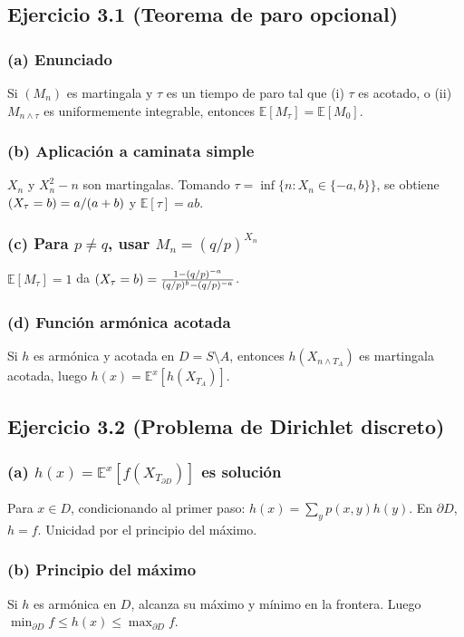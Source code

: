 \documentclass[12pt]{article}
\let\P\relax
\newcommand{\P}{\mathbb{P}}
\newcommand{\E}{\mathbb{E}}
\newcommand{\1}{\mathbf{1}}
\begin{document}
\subsection{Ejercicio 3.1 (Teorema de paro opcional)}

\subsubsection*{(a) Enunciado}
Si $(M_n)$ es martingala y $\tau$ es un tiempo de paro tal que (i) $\tau$ es acotado, o (ii) $M_{n\wedge\tau}$ es uniformemente integrable, entonces $\E[M_\tau]=\E[M_0]$.

\subsubsection*{(b) Aplicaci\'on a caminata simple}
$X_n$ y $X_n^2-n$ son martingalas. Tomando $\tau=\inf\{n:X_n\in\{-a,b\}\}$, se obtiene $\P(X_\tau=b)=a/(a+b)$ y $\E[\tau]=ab$.

\subsubsection*{(c) Para $p\neq q$, usar $M_n=(q/p)^{X_n}$}
$\E[M_\tau]=1$ da $\P(X_\tau=b)=\frac{1-(q/p)^{-a}}{(q/p)^b-(q/p)^{-a}}$.

\subsubsection*{(d) Funci\'on arm\'onica acotada}
Si $h$ es arm\'onica y acotada en $D=S\setminus A$, entonces $h(X_{n\wedge T_A})$ es martingala acotada, luego $h(x)=\E^x[h(X_{T_A})]$.

\subsection{Ejercicio 3.2 (Problema de Dirichlet discreto)}

\subsubsection*{(a) $h(x)=\E^x[f(X_{T_{\partial D}})]$ es soluci\'on}
Para $x\in D$, condicionando al primer paso: $h(x)=\sum_y p(x,y)h(y)$. En $\partial D$, $h=f$. Unicidad por el principio del m\'aximo.

\subsubsection*{(b) Principio del m\'aximo}
Si $h$ es arm\'onica en $D$, alcanza su m\'aximo y m\'inimo en la frontera. Luego $\min_{\partial D}f\le h(x)\le\max_{\partial D}f$.
\end{document}
